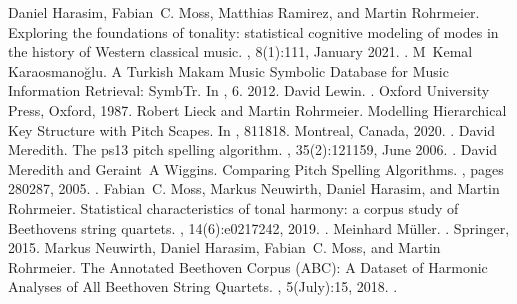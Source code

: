 \documentclass[letterpaper,10pt,english]{sphinxmanual}
\begin{document}
\begin{sphinxthebibliography}{10}
Daniel Harasim, Fabian C. Moss, Matthias Ramirez, and Martin Rohrmeier. Exploring the foundations of tonality: statistical cognitive modeling of modes in the history of Western classical music. , 8(1):1\textendash{}11, January 2021. .
M Kemal Karaosmanoğlu. A Turkish Makam Music Symbolic Database for Music Information Retrieval: SymbTr. In , 6. 2012.
David Lewin. . Oxford University Press, Oxford, 1987.
Robert Lieck and Martin Rohrmeier. Modelling Hierarchical Key Structure with Pitch Scapes. In , 811\textendash{}818. Montreal, Canada, 2020. .
David Meredith. The ps13 pitch spelling algorithm. , 35(2):121\textendash{}159, June 2006. .
David Meredith and Geraint A Wiggins. Comparing Pitch Spelling Algorithms. , pages 280\textendash{}287, 2005. .
Fabian C. Moss, Markus Neuwirth, Daniel Harasim, and Martin Rohrmeier. Statistical characteristics of tonal harmony: a corpus study of Beethoven\textquotesingle{}s string quartets. , 14(6):e0217242, 2019. .
Meinhard Müller. . Springer, 2015.
Markus Neuwirth, Daniel Harasim, Fabian C. Moss, and Martin Rohrmeier. The Annotated Beethoven Corpus (ABC): A Dataset of Harmonic Analyses of All Beethoven String Quartets. , 5(July):1\textendash{}5, 2018. .

\end{sphinxthebibliography}
\end{document}
